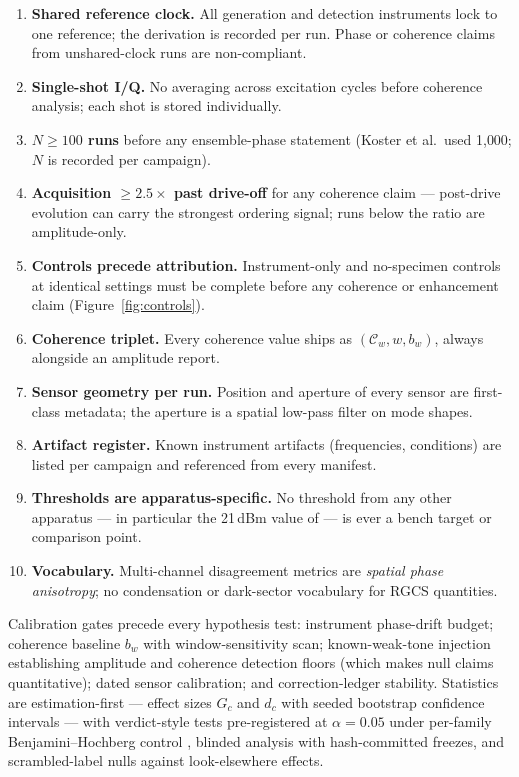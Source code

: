 \documentclass[10pt,letterpaper]{article}
\newcommand{\Cw}{\mathcal{C}_{w}}
\begin{document}
\begin{enumerate}
\item \textbf{Shared reference clock.} All generation and detection
instruments lock to one reference; the derivation is recorded per run.
Phase or coherence claims from unshared-clock runs are non-compliant.
\item \textbf{Single-shot I/Q.} No averaging across excitation cycles
before coherence analysis; each shot is stored individually.
\item \textbf{$N \ge 100$ runs} before any ensemble-phase statement
(Koster et al.\ used 1{,}000; $N$ is recorded per campaign).
\item \textbf{Acquisition $\ge 2.5\times$ past drive-off} for any
coherence claim — post-drive evolution can carry the strongest ordering
signal; runs below the ratio are amplitude-only.
\item \textbf{Controls precede attribution.} Instrument-only and
no-specimen controls at identical settings must be complete before any
coherence or enhancement claim (Figure~\ref{fig:controls}).
\item \textbf{Coherence triplet.} Every coherence value ships as
$(\Cw, w, b_w)$, always alongside an amplitude report.
\item \textbf{Sensor geometry per run.} Position and aperture of every
sensor are first-class metadata; the aperture is a spatial low-pass filter
on mode shapes.
\item \textbf{Artifact register.} Known instrument artifacts (frequencies,
conditions) are listed per campaign and referenced from every manifest.
\item \textbf{Thresholds are apparatus-specific.} No threshold from any
other apparatus — in particular the 21\,dBm value of
\citet{koster2026} — is ever a bench target or comparison point.
\item \textbf{Vocabulary.} Multi-channel disagreement metrics are
\emph{spatial phase anisotropy}; no condensation or dark-sector vocabulary
for RGCS quantities.
\end{enumerate}

Calibration gates precede every hypothesis test: instrument phase-drift
budget; coherence baseline $b_w$ with window-sensitivity scan;
known-weak-tone injection establishing amplitude and coherence detection
floors (which makes null claims quantitative); dated sensor calibration;
and correction-ledger stability. Statistics are estimation-first — effect
sizes $G_c$ and $d_c$ with seeded bootstrap confidence intervals
\citep{efron1979} — with verdict-style tests pre-registered at
$\alpha = 0.05$ under per-family Benjamini--Hochberg control
\citep{benjamini1995}, blinded analysis with hash-committed freezes, and
scrambled-label nulls against look-elsewhere effects.
\end{document}
